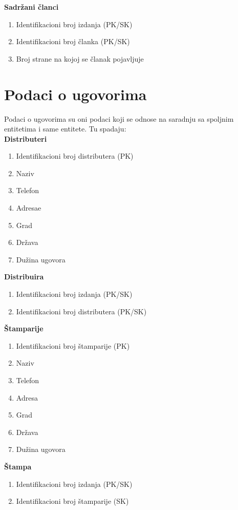 \noindent \textbf{Sadržani članci}
\begin{enumerate}
\item Identifikacioni broj izdanja (PK/SK)
\item Identifikacioni broj članka (PK/SK)
\item Broj strane na kojoj se članak pojavljuje
\end{enumerate} \vspace{5mm}

\section{Podaci o ugovorima}
Podaci o ugovorima su oni podaci koji se odnose na saradnju sa spoljnim entitetima i same entitete. Tu spadaju:\\

\noindent \textbf{Distributeri}
\begin{enumerate}
\item Identifikacioni broj distributera (PK)
\item Naziv
\item Telefon
\item Adresae
\item Grad
\item Država
\item Dužina ugovora
\end{enumerate} \vspace{5mm}

\noindent \textbf{Distribuira}
\begin{enumerate}
\item Identifikacioni broj izdanja (PK/SK)
\item Identifikacioni broj distributera (PK/SK)
\end{enumerate} \vspace{5mm}

\noindent \textbf{Štamparije}
\begin{enumerate}
\item Identifikacioni broj štamparije (PK)
\item Naziv
\item Telefon
\item Adresa
\item Grad
\item Država
\item Dužina ugovora
\end{enumerate} \vspace{5mm}

\noindent \textbf{Štampa}
\begin{enumerate}
\item Identifikacioni broj izdanja (PK/SK)
\item Identifikacioni broj štamparije (SK)
\end{enumerate} \vspace{5mm}

